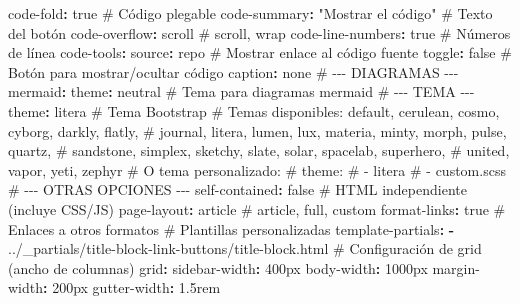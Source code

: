 \documentclass[
  doc,
  floatsintext,
  longtable,
  a4paper,
  nolmodern,
  notxfonts,
  notimes,
  12pt,
  colorlinks=true,linkcolor=blue,citecolor=blue,urlcolor=blue]{apa7}
\newenvironment{Shaded}{\begin{snugshade}}{\end{snugshade}}
\newcommand{\AttributeTok}[1]{\textcolor[rgb]{0.40,0.45,0.13}{#1}}
\newcommand{\CharTok}[1]{\textcolor[rgb]{0.13,0.47,0.30}{#1}}
\newcommand{\CommentTok}[1]{\textcolor[rgb]{0.37,0.37,0.37}{#1}}
\newcommand{\FunctionTok}[1]{\textcolor[rgb]{0.28,0.35,0.67}{#1}}
\newcommand{\KeywordTok}[1]{\textcolor[rgb]{0.00,0.23,0.31}{\textbf{#1}}}
\newcommand{\StringTok}[1]{\textcolor[rgb]{0.13,0.47,0.30}{#1}}
\newcounter{none} %
\begin{document}
\begin{Shaded}
\begin{Highlighting}[]
\AttributeTok{    }\FunctionTok{code{-}fold}\KeywordTok{:}\AttributeTok{ }\CharTok{true}\CommentTok{               \# Código plegable}
\AttributeTok{    }\FunctionTok{code{-}summary}\KeywordTok{:}\AttributeTok{ }\StringTok{"Mostrar el código"}\CommentTok{     \# Texto del botón}
\AttributeTok{    }\FunctionTok{code{-}overflow}\KeywordTok{:}\AttributeTok{ scroll}\CommentTok{         \# scroll, wrap}
\AttributeTok{    }\FunctionTok{code{-}line{-}numbers}\KeywordTok{:}\AttributeTok{ }\CharTok{true}\CommentTok{       \# Números de línea}
\AttributeTok{    }\FunctionTok{code{-}tools}\KeywordTok{:}
\AttributeTok{      }\FunctionTok{source}\KeywordTok{:}\AttributeTok{ repo}\CommentTok{                \# Mostrar enlace al código fuente}
\AttributeTok{      }\FunctionTok{toggle}\KeywordTok{:}\AttributeTok{ }\CharTok{false}\CommentTok{               \# Botón para mostrar/ocultar código}
\AttributeTok{      }\FunctionTok{caption}\KeywordTok{:}\AttributeTok{ none}
\AttributeTok{    }
\CommentTok{    \# {-}{-}{-} DIAGRAMAS {-}{-}{-}}
\AttributeTok{    }\FunctionTok{mermaid}\KeywordTok{:}
\AttributeTok{      }\FunctionTok{theme}\KeywordTok{:}\AttributeTok{ neutral}\CommentTok{              \# Tema para diagramas mermaid}
\AttributeTok{    }
\CommentTok{    \# {-}{-}{-} TEMA {-}{-}{-}}
\AttributeTok{    }\FunctionTok{theme}\KeywordTok{:}\AttributeTok{ litera}\CommentTok{                 \# Tema Bootstrap}
\CommentTok{    \# Temas disponibles: default, cerulean, cosmo, cyborg, darkly, flatly,}
\CommentTok{    \# journal, litera, lumen, lux, materia, minty, morph, pulse, quartz,}
\CommentTok{    \# sandstone, simplex, sketchy, slate, solar, spacelab, superhero,}
\CommentTok{    \# united, vapor, yeti, zephyr}
\AttributeTok{    }
\CommentTok{    \# O tema personalizado:}
\CommentTok{    \# theme: }
\CommentTok{    \#   {-} litera}
\CommentTok{    \#   {-} custom.scss}
\AttributeTok{    }
\CommentTok{    \# {-}{-}{-} OTRAS OPCIONES {-}{-}{-}}
\AttributeTok{    }\FunctionTok{self{-}contained}\KeywordTok{:}\AttributeTok{ }\CharTok{false}\CommentTok{         \# HTML independiente (incluye CSS/JS)}
\AttributeTok{    }\FunctionTok{page{-}layout}\KeywordTok{:}\AttributeTok{ article}\CommentTok{          \# article, full, custom}
\AttributeTok{    }\FunctionTok{format{-}links}\KeywordTok{:}\AttributeTok{ }\CharTok{true}\CommentTok{            \# Enlaces a otros formatos}
\AttributeTok{    }
\CommentTok{    \# Plantillas personalizadas}
\AttributeTok{    }\FunctionTok{template{-}partials}\KeywordTok{:}
\AttributeTok{      }\KeywordTok{{-}}\AttributeTok{ ../\_partials/title{-}block{-}link{-}buttons/title{-}block.html}
\AttributeTok{    }
\CommentTok{    \# Configuración de grid (ancho de columnas)}
\AttributeTok{    }\FunctionTok{grid}\KeywordTok{:}
\AttributeTok{      }\FunctionTok{sidebar{-}width}\KeywordTok{:}\AttributeTok{ 400px}
\AttributeTok{      }\FunctionTok{body{-}width}\KeywordTok{:}\AttributeTok{ 1000px}
\AttributeTok{      }\FunctionTok{margin{-}width}\KeywordTok{:}\AttributeTok{ 200px}
\AttributeTok{      }\FunctionTok{gutter{-}width}\KeywordTok{:}\AttributeTok{ 1.5rem}
\end{Highlighting}
\end{Shaded}
\end{document}
